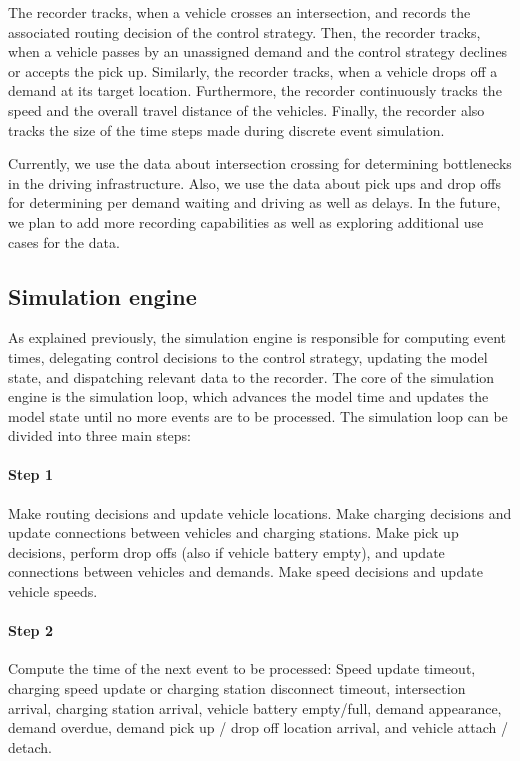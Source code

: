 \documentclass[a4paper,twoside]{article}
\begin{document}
	The recorder tracks, when a vehicle crosses an intersection, and records the associated routing decision of the control strategy.
	Then, the recorder tracks, when a vehicle passes by an unassigned demand and the control strategy declines or accepts the pick up.
	Similarly, the recorder tracks, when a vehicle drops off a demand at its target location.
	Furthermore, the recorder continuously tracks the speed and the overall travel distance of the vehicles.
	Finally, the recorder also tracks the size of the time steps made during discrete event simulation.
	
	Currently, we use the data about intersection crossing for determining bottlenecks in the driving infrastructure.
	Also, we use the data about pick ups and drop offs for determining per demand waiting and driving as well as delays.
	In the future, we plan to add more recording capabilities as well as exploring additional use cases for the data.
	
	\subsection{Simulation engine}
	\label{sec:simulation-engine}
	
	As explained previously, the simulation engine is responsible for computing event times, delegating control decisions to the control strategy, updating the model state, and dispatching relevant data to the recorder.
	The core of the simulation engine is the simulation loop, which advances the model time and updates the model state until no more events are to be processed.
	The simulation loop can be divided into three main steps:
	
	\paragraph{Step 1}
	
	Make routing decisions and update vehicle locations.
	Make charging decisions and update connections between vehicles and charging stations.
	Make pick up decisions, perform drop offs (also if vehicle battery empty), and update connections between vehicles and demands.
	Make speed decisions and update vehicle speeds.
	
	\paragraph{Step 2}
	
	Compute the time of the next event to be processed:
	Speed update timeout,
	charging speed update or charging station disconnect timeout,
	intersection arrival,
	charging station arrival,
	vehicle battery empty/full,
	demand appearance,
	demand overdue,
	demand pick up / drop off location arrival, and
	vehicle attach / detach.
	
\end{document}
